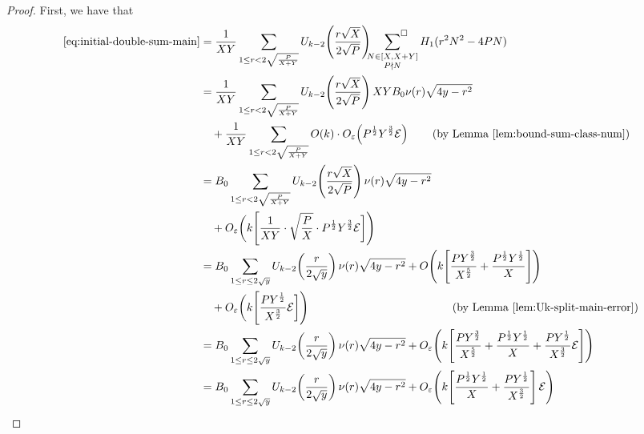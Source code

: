 \documentclass[12pt,letterpaper,reqno]{amsart}
\theoremstyle{plain}
\theoremstyle{definition}
\numberwithin{equation}{section}
\numberwithin{figure}{section}
\numberwithin{table}{section}
\newcommand{\lrp}[1]{\!\left(#1\right)}
\newcommand{\lrb}[1]{\!\left[#1\right]}
\newcommand{\EE}{\mathcal{E}}
\begin{document}
\begin{proof}
        
    
    First, we have that
    \begin{align}
        \eqref{eq:initial-double-sum-main} 
        &= \frac{1}{XY}\sum_{1\leq r<2\sqrt{\frac{P{}}{X+Y}}} U_{k-2}\lrp{\frac{r\sqrt{X}}{2\sqrt{P}}}
        \sideset{}{^\square}\sum_{\substack{N\in[X,X+Y]\\ P\nmid N}} H_1(r^2N^2-4PN) \\
        &= \frac{1}{XY} \sum_{1\leq r< 2\sqrt{\frac{P}{X+Y}}} 
        U_{k-2}\lrp{\frac{r\sqrt{X}}{2\sqrt{P}}} XYB_0\nu(r)\sqrt{4y-r^2} \\ 
        &\quad + \frac{1}{XY} \sum_{1\leq r< 2\sqrt{\frac{P}{X+Y}}}  O(k) 
        \cdot O_\varepsilon\lrp{P^\frac{1}{2} Y^\frac{3}{2} \EE }
        \qquad \text{(by Lemma \ref{lem:bound-sum-class-num})}
        \\
        &= B_0 \sum_{1\leq r< 2\sqrt{\frac{P}{X+Y}}} 
        U_{k-2}\lrp{\frac{r\sqrt{X}}{2\sqrt{P}}}\nu(r)\sqrt{4y-r^2} \\ 
        &\quad +
         O_\varepsilon\bigg(k \Bigg[
        \frac{1}{XY} \cdot \sqrt{\frac{P}{X}} \cdot P^\frac{1}{2} Y^\frac{3}{2} \EE
        \bigg]
        \Bigg)  \\ 
        &= B_0 \sum_{1\leq r\le 2\sqrt{y}} U_{k-2}\lrp{\frac{r}{2\sqrt{y}}}\nu(r) \sqrt{4y-r^2} + O\lrp{k\lrb{\frac{PY^\frac{3}{2}}{X^{\frac{5}{2}}}+\frac{P^\frac{1}{2}Y^\frac{1}{2}}{X}}} \\ 
        &\quad +
         O_\varepsilon\bigg(k \Bigg[
        \frac{P Y^\frac{1}{2}}{X^\frac{3}{2}} \EE
        \bigg] 
        \Bigg) \hspace{45mm} \text{(by Lemma \ref{lem:Uk-split-main-error})} \\ 
        &= B_0 \sum_{1\leq r\le 2\sqrt{y}} U_{k-2}\lrp{\frac{r}{2\sqrt{y}}}\nu(r) \sqrt{4y-r^2}   +
        O_\varepsilon\lrp{k\lrb{
            \frac{PY^\frac{3}{2}}{X^{\frac{5}{2}}}
            +
            \frac{P^\frac{1}{2}Y^\frac{1}{2}}{X} 
            +
            \frac{P Y^\frac{1}{2}}{X^\frac{3}{2}} \EE
        }} \\
        &= B_0 \sum_{1\leq r\le 2\sqrt{y}} U_{k-2}\lrp{\frac{r}{2\sqrt{y}}}\nu(r) \sqrt{4y-r^2}   +
        O_\varepsilon\lrp{k\lrb{
            \frac{P^\frac{1}{2}Y^\frac{1}{2}}{X} 
            +
            \frac{P Y^\frac{1}{2}}{X^\frac{3}{2}} 
        } \EE
        } \\

\end{align}
\end{proof}
\end{document}
